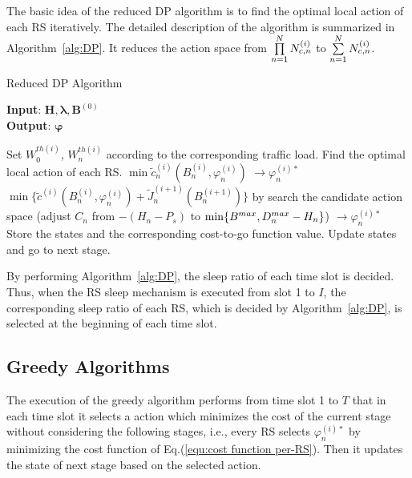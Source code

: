 \documentclass[conference]{IEEEtran}
\begin{document}
 The basic idea of the reduced DP algorithm is to find the optimal local action of each RS iteratively. The detailed description of the algorithm is summarized in Algorithm~\ref{alg:DP}. It reduces the action space from $\footnotesize{\prod\limits_{n=1}^NN_{c,n}^{(i)}}$ to $\footnotesize{\sum\limits_{n=1}^NN_{c,n}^{(i)}}$.
 \vspace{-0.3cm}
 \begin{algorithm}[htb]
 \caption{Reduced DP Algorithm}
 \textbf{Input}:{ $\boldsymbol{H}, \boldsymbol{\lambda}, \boldsymbol{B}^{(0)}$}\\
 \textbf{Output}:{ $\boldsymbol{\varphi}$}
 \begin{algorithmic}[1]
 \label{alg:DP}
    \STATE Set $W_0^{th(i)}$, $W_n^{th(i)}$ according to the corresponding traffic load.
        \STATE Find the optimal local action of each RS.
                \STATE
                $\min\tilde{c}_n^{(i)}(B_n^{(i)},\varphi_n^{(i)})$ $\rightarrow \varphi_n^{(i)*}$
            \ELSE
                \STATE $\min\{\tilde{c}^{(i)}(B_n^{(i)},\varphi_n^{(i)})+\tilde{J}_n^{(i+1)}(B_n^{(i+1)})\}$ by search the candidate action space (adjust $C_n$ from $-(H_n-P_s)$ to $\footnotesize{\min\{B^{max},D_n^{max}-H_n\}}$)
                $\rightarrow \varphi_n^{(i)*}$
            \ENDIF
        \STATE Store the states and the corresponding cost-to-go function value.
    \ENDFOR
    \STATE Update states and go to next stage.
 \ENDFOR
\end{algorithmic}
 \end{algorithm}
 \vspace{-0.3cm}

 By performing Algorithm~\ref{alg:DP}, the sleep ratio of each time slot is decided. Thus, when the RS sleep mechanism is executed from slot 1 to $I$, the corresponding sleep ratio of each RS, which is decided by Algorithm~\ref{alg:DP}, is selected at the beginning of each time slot.

 \subsection{Greedy Algorithms}
 The execution of the greedy algorithm performs from time slot 1 to $T$ that in each time slot it selects a action which minimizes the cost of the current stage without considering the following stages, i.e., every RS selects $\varphi_n^{(i)*}$ by minimizing the cost function of Eq.(\ref{equ:cost function per-RS}). Then it updates the state of next stage based on the selected action.
\end{document}
